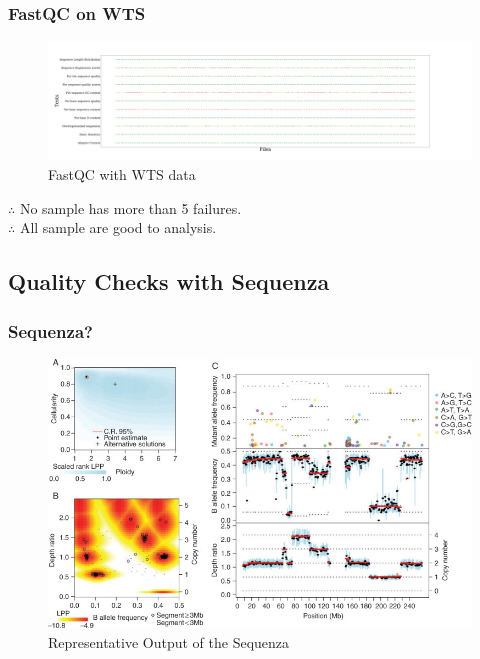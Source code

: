\documentclass{beamer}
\begin{document}
    \begin{frame}
        \frametitle{FastQC on WTS}

        \begin{figure}
            \includegraphics[width=\linewidth]{figures/FastQC/FastQC_WTS.pdf}
            \caption{FastQC with WTS data}
        \end{figure}

        $\therefore$ No sample has more than 5 failures. \\
        $\therefore$ All sample are good to analysis.
    \end{frame}

    \subsection{Quality Checks with Sequenza}
    \begin{frame}
        \frametitle{Sequenza?}

        \begin{figure}
            \includegraphics[width=0.6 \linewidth]{figures/Workflow/sequenza.jpg}
            \caption{Representative Output of the Sequenza \protect\cite{sequenza1}}
        \end{figure}
    \end{frame}
\end{document}
